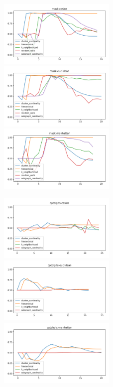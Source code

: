 \begin{figure}[!t]
\includegraphics[width=2.2in]{kdd/static/auc_vs_depth/musk-cosine.png}
\includegraphics[width=2.2in]{kdd/static/auc_vs_depth/musk-euclidean.png}
\includegraphics[width=2.2in]{kdd/static/auc_vs_depth/musk-manhattan.png}

\includegraphics[width=2.2in]{kdd/static/auc_vs_depth/optdigits-cosine.png}
\includegraphics[width=2.2in]{kdd/static/auc_vs_depth/optdigits-euclidean.png}
\includegraphics[width=2.2in]{kdd/static/auc_vs_depth/optdigits-manhattan.png}


\end{figure}
